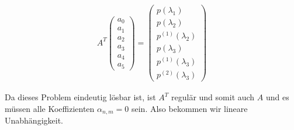 \begin{solution}
\begin{enumerate}[label = \textbf{\alph*)}]
  \begin{align*}
    A^T  \begin{pmatrix}
      a_0 \\ a_1 \\ a_2 \\ a_3 \\ a_4 \\ a_5
    \end{pmatrix} =
    \begin{pmatrix}
      p(\lambda_1) \\ p(\lambda_2) \\ p^{(1)}(\lambda_2) \\ p(\lambda_3) \\ p^{(1)}(\lambda_3) \\ p^{(2)}(\lambda_3)
    \end{pmatrix}
  \end{align*}

  Da dieses Problem eindeutig lösbar ist, ist $A^T$ regulär und somit auch $A$ und es müssen alle Koeffizienten $\alpha_{n,m} = 0$ sein. Also bekommen wir lineare Unabhängigkeit.
\end{enumerate}
\end{solution}
